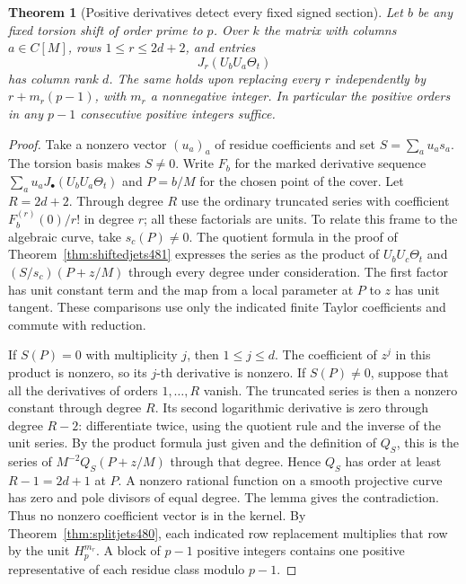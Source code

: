 \documentclass[a4paper,11pt]{article}
\newtheorem{theorem}[proposition]{Theorem}
\theoremstyle{definition}
\theoremstyle{remark}
\numberwithin{equation}{section}
\begin{document}
\begin{theorem}[Positive derivatives detect every fixed signed section]\leavevmode
\label{thm:positivejets482}
Let \(b\) be any fixed torsion shift of order prime to \(p\).
Over \(k\) the matrix with columns \(a\in C[M]\), rows
\(1\le r\le 2d+2\), and entries
\[
                   J_r(U_bU_a\Theta_t)
\]
has column rank \(d\). The same holds upon replacing every \(r\)
independently by \(r+m_r(p-1)\), with \(m_r\) a nonnegative
integer. In particular the positive orders in any \(p-1\)
consecutive positive integers suffice.
\end{theorem}
\begin{proof}
Take a nonzero vector \((u_a)_a\) of residue coefficients and set
\(S=\sum_a u_as_a\). The torsion basis makes \(S\ne0\).
Write \(F_b\) for the marked derivative sequence
\(\sum_a u_a J_\bullet(U_bU_a\Theta_t)\) and \(P=b/M\) for the
chosen point of the cover. Let \(R=2d+2\). Through degree \(R\)
use the ordinary truncated series with coefficient
\(F_b^{(r)}(0)/r!\) in degree \(r\); all these factorials are
units. To relate this frame to the algebraic curve, take
\(s_c(P)\ne0\). The quotient formula in the proof of
Theorem~\ref{thm:shiftedjets481} expresses the series as the
product of \(U_bU_c\Theta_t\) and
\((S/s_c)(P+z/M)\) through every degree under consideration.
The first factor has unit constant term and the map from a local
parameter at \(P\) to \(z\) has unit tangent. These comparisons
use only the indicated finite Taylor coefficients and commute with
reduction.

If \(S(P)=0\) with multiplicity \(j\), then \(1\le j\le d\).
The coefficient of \(z^j\) in this product is nonzero, so its
\(j\)-th derivative is nonzero. If \(S(P)\ne0\), suppose that
all the derivatives of orders \(1,\ldots,R\) vanish. The truncated
series is then a nonzero constant through degree \(R\). Its
second logarithmic derivative is zero through degree \(R-2\):
differentiate twice, using the quotient rule and the inverse of
the unit series. By the product formula just given and the
definition of \(Q_S\), this is the series of
\(M^{-2}Q_S(P+z/M)\) through that degree. Hence \(Q_S\) has
order at least \(R-1=2d+1\) at \(P\).
A nonzero rational function on a smooth projective curve has zero
and pole divisors of equal degree. The lemma gives the
contradiction. Thus no nonzero coefficient vector is in the
kernel. By Theorem~\ref{thm:splitjets480}, each indicated row
replacement multiplies that row by the unit \(H_p^{m_r}\).
A block of \(p-1\) positive integers contains one positive
representative of each residue class modulo \(p-1\).
\end{proof}
\end{document}
